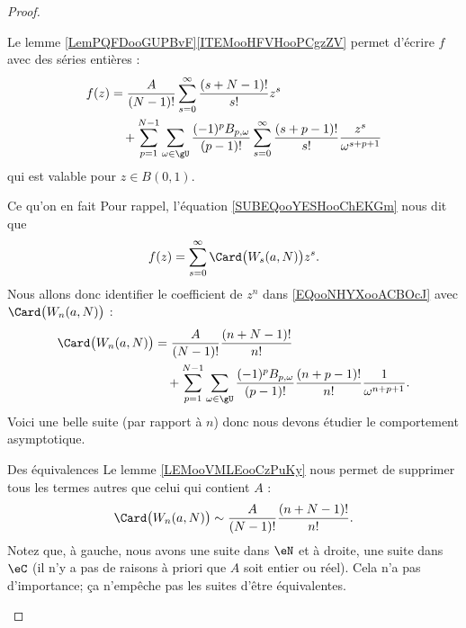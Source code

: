 \begin{proof}
\begin{subproof}
        Le lemme \ref{LemPQFDooGUPBvF}\ref{ITEMooHFVHooPCgzZV} permet d'écrire \( f\) avec des séries entières :
        \begin{equation}        \label{EQooNHYXooACBOcJ}
            \begin{aligned}[]
            f(z)&=  \frac{A}{ (N-1)! }\sum_{s=0}^{\infty}\frac{ (s+N-1)! }{ s! }z^s\\
            &\quad+\sum_{p=1}^{N-1}\sum_{\omega\in \gU}\frac{(-1)^pB_{p,\omega}}{ (p-1)! }\sum_{s=0}^{\infty}\frac{ (s+p-1)! }{ s! }\frac{ z^s }{ \omega^{s+p+1} }
            \end{aligned}
        \end{equation}
        qui est valable pour \( z\in B(0,1)\).
        
    \item[Ce qu'on en fait]
        Pour rappel, l'équation \eqref{SUBEQooYESHooChEKGm} nous dit que
        \begin{equation}
            f(z)=\sum_{s=0}^{\infty}\Card\big( W_s(a,N) \big)z^s.
        \end{equation}
        Nous allons donc identifier le coefficient de \( z^n\) dans \eqref{EQooNHYXooACBOcJ} avec \( \Card\big( W_n(a,N) \big)\) :
        \begin{equation}
            \begin{aligned}[]
            \Card\big( W_n(a,N) \big)&=\frac{ A }{ (N-1)! }\frac{ (n+N-1)! }{ n! }\\
            &\quad+\sum_{p=1}^{N-1}\sum_{\omega\in \gU}\frac{ (-1)^{p}B_{p,\omega} }{ (p-1)! }\frac{ (n+p-1)! }{ n! }\frac{1}{ \omega^{n+p+1} }.
            \end{aligned}
        \end{equation}
        Voici une belle suite (par rapport à \( n\)) donc nous devons étudier le comportement asymptotique.
    \item[Des équivalences]
        Le lemme \ref{LEMooVMLEooCzPuKy} nous permet de supprimer tous les termes autres que celui qui contient \( A\) :
        \begin{equation}
            \Card\big( W_n(a,N) \big)\sim\frac{ A }{ (N-1)! }\frac{ (n+N-1)! }{ n! }.
        \end{equation}
        Notez que, à gauche, nous avons une suite dans \( \eN\) et à droite, une suite dans \( \eC\) (il n'y a pas de raisons à priori que \( A\) soit entier ou réel). Cela n'a pas d'importance; ça n'empêche pas les suites d'être équivalentes.


\end{subproof}
\end{proof}
